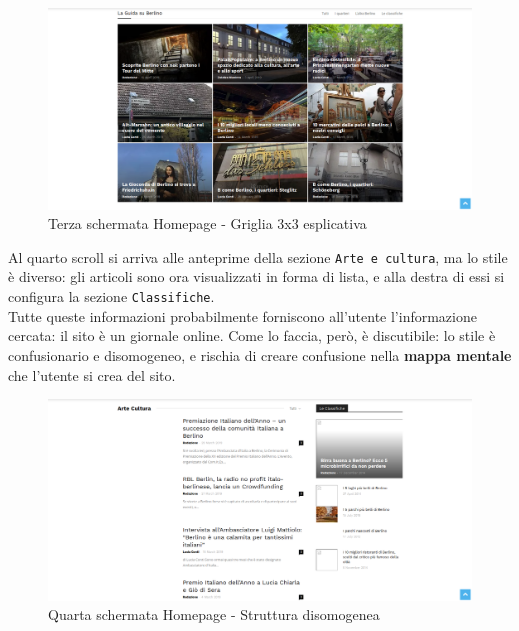 \begin{figure}[htbp]
\begin{center}
\includegraphics[width=35em]{img/home3}
\caption{Terza schermata Homepage - Griglia 3x3 esplicativa}
\end{center}
\end{figure}
\vspace{30pt}


Al quarto scroll si arriva alle anteprime della sezione \texttt{Arte e cultura}, ma lo stile è diverso: gli articoli sono ora visualizzati in forma di lista, e alla destra di essi si configura la sezione \texttt{Classifiche}. \\
Tutte queste informazioni probabilmente forniscono all'utente l'informazione cercata: il sito è un giornale online. Come lo faccia, però, è discutibile: lo stile è confusionario e disomogeneo, e rischia di creare confusione nella \textbf{mappa mentale} che l'utente si crea del sito. \\

\vspace{30pt}
\begin{figure}[htbp]
\begin{center}
\includegraphics[width=35em]{img/home4}
\caption{Quarta schermata Homepage - Struttura disomogenea}
\end{center}
\end{figure}
\vspace{30pt}


